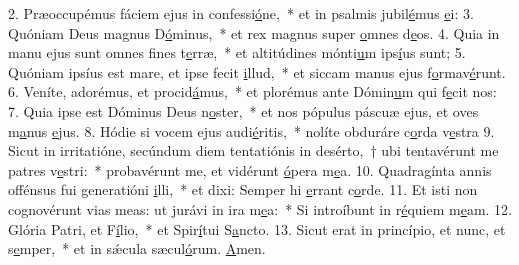2. Præoccupémus fáciem ejus in confessi\uline{ó}ne,~* et in psalmis jubil\uline{é}mus \uline{e}i:
3. Quóniam Deus magnus D\uline{ó}minus,~* et rex magnus super \uline{o}mnes d\uline{e}os.
4. Quia in manu ejus sunt omnes fines t\uline{e}rræ,~* et altitúdines mónti\uline{u}m ips\uline{í}us sunt;
5. Quóniam ipsíus est mare, et ipse fecit \uline{i}llud,~* et siccam manus ejus f\uline{o}rmav\uline{é}runt.
6. Veníte, adorémus, et procid\uline{á}mus,~* et plorémus ante Dómin\uline{u}m qui f\uline{e}cit nos:
7. Quia ipse est Dóminus Deus n\uline{o}ster,~* et nos pópulus páscuæ ejus, et oves m\uline{a}nus \uline{e}jus.
8. Hódie si vocem ejus audi\uline{é}ritis,~* nolíte obduráre c\uline{o}rda v\uline{e}stra
9. Sicut in irritatióne, secúndum diem tentatiónis in desérto,~† ubi tentavérunt me patres v\uline{e}stri:~* probavérunt me, et vidérunt \uline{ó}pera m\uline{e}a.
10. Quadragínta annis offénsus fui generatióni \uline{i}lli,~* et dixi: Semper hi \uline{e}rrant c\uline{o}rde.
11. Et isti non cognovérunt vias meas: ut jurávi in ira m\uline{e}a:~* Si introíbunt in r\uline{é}quiem m\uline{e}am.
12. Glória Patri, et F\uline{í}lio,~* et Spir\uline{í}tui S\uline{a}ncto.
13. Sicut erat in princípio, et nunc, et s\uline{e}mper,~* et in sǽcula sæcul\uline{ó}rum. \uline{A}men.

